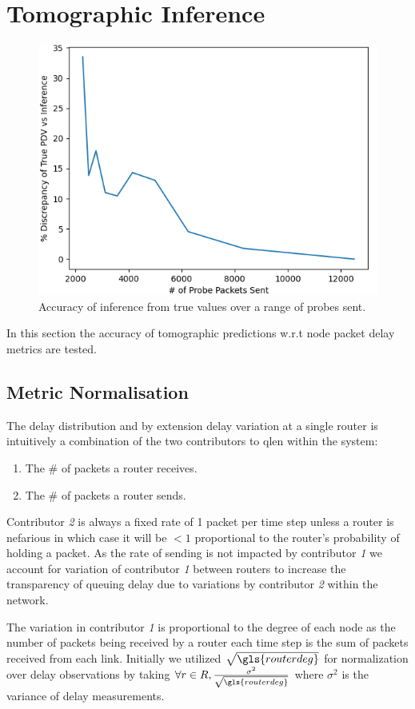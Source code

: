 \section{Tomographic Inference}
\begin{figure}[H]
        \centering
        \includegraphics[width=\textwidth]{figs/results/Probe_PDV_accuracy_plot.png}
        \caption{Accuracy of inference from true values over a range of probes sent.}
        \label{fig:Rqstabilization}
\end{figure}
In this section the accuracy of tomographic predictions w.r.t node packet delay metrics are tested.

\subsection{Metric Normalisation}
\label{ssec:Rmetricnormalisation}
The delay distribution and by extension delay variation at a single router is intuitively a combination of the two contributors to \gls{qlen} within the system:
\begin{enumerate}
    \item The \# of packets a router receives.
    \item The \# of packets a router sends.
\end{enumerate}
Contributor \emph{2} is always a fixed rate of 1 packet per time step unless a router is nefarious in which case it will be $<1$ proportional to the router's probability of holding a packet. As the rate of sending is not impacted by contributor \emph{1} we account for variation of contributor \emph{1} between routers to increase the transparency of queuing delay due to variations by contributor \emph{2} within the network.\par
The variation in contributor \emph{1} is proportional to the degree of each node as the number of packets being received by a router each time step is the sum of packets received from each link. Initially we utilized $\sqrt{\gls{routerdeg}}$ for normalization over delay observations by taking $\forall r\in R, \frac{\sigma^2}{\sqrt{\gls{routerdeg}}}$ where $\sigma^2$ is the variance of delay measurements.

